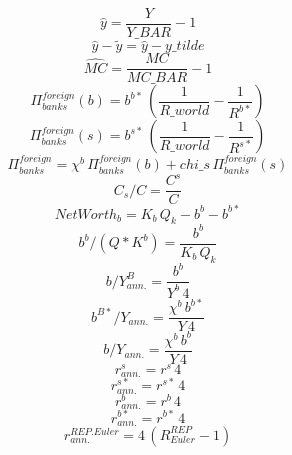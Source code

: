 \documentclass[10pt,a4paper]{article}
\begin{document}
\begin{dmath}
 \hat{y} =\frac{Y}{Y\_BAR}-1
\end{dmath}
\begin{dmath}
 \hat{y} - \tilde{y} = \hat{y} -y\_tilde
\end{dmath}
\begin{dmath}
 \hat{MC} =\frac{MC}{MC\_BAR}-1
\end{dmath}
\begin{dmath}
\Pi^{foreign}_{banks}(b)=b^{b*}\, \left(\frac{1}{R\_world}-\frac{1}{R^{b*}}\right)
\end{dmath}
\begin{dmath}
\Pi^{foreign}_{banks}(s)=b^{s*}\, \left(\frac{1}{R\_world}-\frac{1}{R^{s*}}\right)
\end{dmath}
\begin{dmath}
\Pi^{foreign}_{banks}=\chi^b \, \Pi^{foreign}_{banks}(b)+chi\_s\, \Pi^{foreign}_{banks}(s)
\end{dmath}
\begin{dmath}
 C_s / C  =\frac{C^s}{C}
\end{dmath}
\begin{dmath}
 NetWorth_b =K_b\,  Q_k -b^b-b^{b*}
\end{dmath}
\begin{dmath}
 b^b / (Q * K^b) =\frac{b^b}{K_b\,  Q_k }
\end{dmath}
\begin{dmath}
 b / Y^B_{ann.} =\frac{b^b}{Y^b\, 4}
\end{dmath}
\begin{dmath}
 b^{B*}/ Y_{ann.} =\frac{\chi^b \, b^{b*}}{Y\, 4}
\end{dmath}
\begin{dmath}
b/ Y_{ann.} =\frac{\chi^b \, b^b}{Y\, 4}
\end{dmath}
\begin{dmath}
r^s_{ann.}=r^s\, 4
\end{dmath}
\begin{dmath}
r^{s*}_{ann.}=r^{s*}\, 4
\end{dmath}
\begin{dmath}
r^b_{ann.}=r^b\, 4
\end{dmath}
\begin{dmath}
r^{b*}_{ann.}=r^{b*}\, 4
\end{dmath}
\begin{dmath}
 r^{REP.Euler}_{ann.} =4\, \left( R^{REP}_{Euler} -1\right)
\end{dmath}
\end{document}
